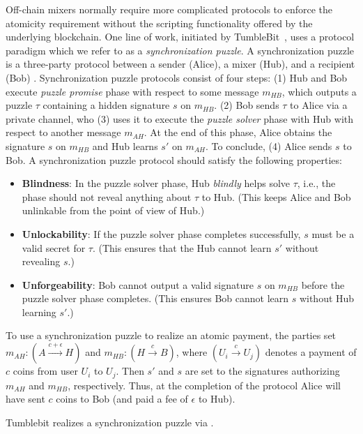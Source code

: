 Off-chain mixers normally require more complicated protocols to enforce the atomicity requirement without the scripting functionality offered by the underlying blockchain. One line of work, initiated by TumbleBit~\cite{NDSS:HABSG17}, uses a protocol paradigm which we refer to as a \emph{synchronization puzzle}. A synchronization puzzle is a three-party protocol between a sender (Alice), a mixer (Hub), and a recipient (Bob) . Synchronization puzzle protocols consist of four steps: (1) Hub and Bob execute \emph{puzzle promise} phase with respect to some message $m_{HB}$, which outputs a puzzle $\tau$ containing a hidden signature $s$ on $m_{HB}$. (2) Bob sends $\tau$ to Alice via a private channel, who (3) uses it to execute the \emph{puzzle solver} phase with Hub with respect to another message $m_{AH}$. At the end of this phase, Alice obtains the signature $s$ on $m_{HB}$ and Hub learns $s'$ on $m_{AH}$. To conclude, (4) Alice sends $s$ to Bob. A synchronization puzzle protocol should satisfy the following properties:
\begin{itemize}
    \item \textbf{Blindness}: In the puzzle solver phase, Hub \emph{blindly} helps solve $\tau$, i.e., the phase should not reveal anything about $\tau$ to Hub. (This keeps Alice and Bob unlinkable from the point of view of Hub.)
    \item \textbf{Unlockability}: If the puzzle solver phase completes successfully, $s$ must be a valid secret for $\tau$. (This ensures that the Hub cannot learn $s'$ without revealing $s$.)
    \item \textbf{Unforgeability}: Bob cannot output a valid signature $s$ on $m_{HB}$ before the puzzle solver phase completes. (This ensures Bob cannot learn $s$ without Hub learning $s'$.)
\end{itemize}
To use a synchronization puzzle to realize an atomic payment, the parties set $m_{AH} : (A \xrightarrow{c+\epsilon} H)$ and $m_{HB} : (H \xrightarrow{c} B)$, where $(U_i \xrightarrow{c} U_j)$ denotes a payment of $c$ coins from user $U_i$ to $U_j$. Then $s'$ and $s$ are set to the signatures authorizing $m_{AH}$ and $m_{HB}$, respectively. Thus, at the completion of the protocol Alice will have sent $c$ coins to Bob (and paid a fee of $\epsilon$ to Hub).

Tumblebit realizes a synchronization puzzle via . 

